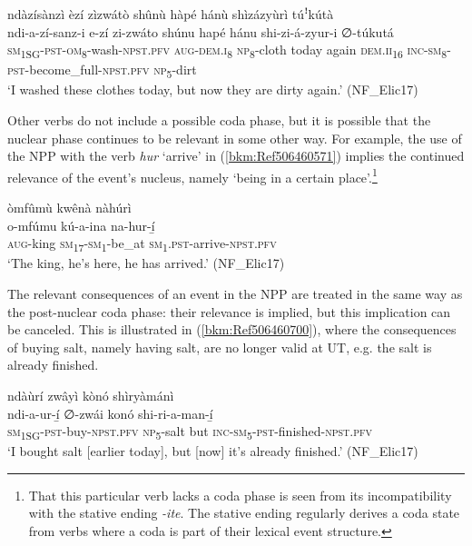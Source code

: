 \ea
\label{bkm:Ref486936353}
ndàzísànzì èzí zìzwátò shûnù hàpé hánù shìzázyùrì túꜝkútà\\
\gll ndi-a-zí-sanz-i      e-zí    zi-zwáto  shúnu hapé  hánu    shi-zi-á-zyur-i        ∅-túkutá\\
\textsc{sm}\textsubscript{1SG}-\textsc{pst}-\textsc{om}\textsubscript{8}-wash-\textsc{npst}.\textsc{pfv}  \textsc{aug}-\textsc{dem}.\textsc{i}\textsubscript{8}  \textsc{np}\textsubscript{8}-cloth  today
again  \textsc{dem}.\textsc{ii}\textsubscript{16}  \textsc{inc}-\textsc{sm}\textsubscript{8}-\textsc{pst}-become\_full-\textsc{npst}.\textsc{pfv}  \textsc{np}\textsubscript{5}-dirt\\
\glt ‘I washed these clothes today, but now they are dirty again.’ (NF\_Elic17)
\z

Other verbs do not include a possible coda phase, but it is possible that the nuclear phase continues to be relevant in some other way. For example, the use of the NPP with the verb \textit{hur} ‘arrive’ in (\ref{bkm:Ref506460571}) implies the continued relevance of the event’s nucleus, namely ‘being in a certain place’.\footnote{That this particular verb lacks a coda phase is seen from its incompatibility with the stative ending \textit{-ite}. The stative ending regularly derives a coda state from verbs where a coda is part of their lexical event structure.}

\ea
\label{bkm:Ref506460571}
òmfûmù kwênà nàhúrì\\
\gll o-mfúmu  kú-a-ina    na-hur-í̲\\
\textsc{aug}-king  \textsc{sm}\textsubscript{17}-\textsc{sm}\textsubscript{1}-be\_at  \textsc{sm}\textsubscript{1}.\textsc{pst}-arrive-\textsc{npst}.\textsc{pfv}\\
\glt ‘The king, he’s here, he has arrived.’ (NF\_Elic17)
\z

The relevant consequences of an event in the NPP are treated in the same way as the post-nuclear coda phase: their relevance is implied, but this implication can be canceled. This is illustrated in (\ref{bkm:Ref506460700}), where the consequences of buying salt, namely having salt, are no longer valid at UT, e.g. the salt is already finished.

\ea
\label{bkm:Ref506460700}
ndàùrí zwâyì kònó shìryàmánì\\
\gll ndi-a-ur-í̲      ∅-zwái  konó  shi-ri-a-man-í̲\\
\textsc{sm}\textsubscript{1SG}-\textsc{pst}-buy-\textsc{npst}.\textsc{pfv}  \textsc{np}\textsubscript{5}-salt  but  \textsc{inc}-\textsc{sm}\textsubscript{5}-\textsc{pst}-finished-\textsc{npst}.\textsc{pfv}\\
\glt ‘I bought salt [earlier today], but [now] it’s already finished.’ (NF\_Elic17)
\z

